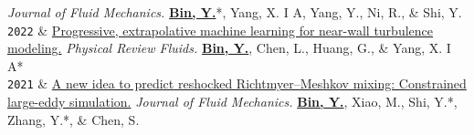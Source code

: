 \documentclass[12pt,letter]{article}
\newcommand{\LastName}{Bin}
\newcommand{\Initials}{Y.}
\newcommand{\Me}{\underline{\textbf{\LastName, \Initials}}}  %
\newcommand{\Xiang}{Yang, X. I A}
\newcommand{\Shi}{Shi, Y.}
\newcommand{\Geogre}{Huang, G.}
\newcommand{\Nirui}{Ni, R.}
\newcommand{\Lihua}{Chen, L.}
\newcommand{\Mengjuan}{Xiao, M.}
\newcommand{\Yousheng}{Zhang, Y.}
\newcommand{\Shiyi}{Chen, S.}
\newcommand{\Yantao}{Yang, Y.}
\newcommand{\Year}[1]{\fontsize{12pt}{0}\selectfont \texttt{#1}}
\begin{document}
\begin{EntriesTableYear}
  \textit{Journal of Fluid Mechanics.}
  \newline
  \Me *, \Xiang, \Yantao, \Nirui, \& \Shi
\\
\Year{2022}  &
  \href{https://doi.org/10.1103/PhysRevFluids.7.084610}{Progressive, extrapolative machine learning for near-wall turbulence modeling.}
  \newline
  \textit{Physical Review Fluids.}
  \newline
  \Me, \Lihua, \Geogre, \& \Xiang *
\\
\Year{2021}  &
  \href{https://doi.org/10.1017/jfm.2021.332}{A new idea to predict reshocked Richtmyer–Meshkov mixing: Constrained large-eddy simulation.}
  \newline
  \textit{Journal of Fluid Mechanics.}
  \newline
  \Me, \Mengjuan, \Shi *, \Yousheng *, \& \Shiyi
\end{EntriesTableYear}

\end{document}
